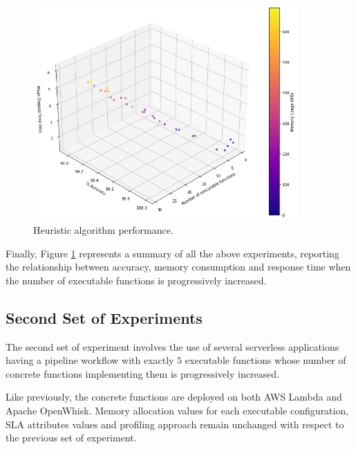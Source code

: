 \documentclass[12pt,a4paper]{report}
\begin{document}
\begin{figure}[h]
	\centering
	\includegraphics[width=0.9\textwidth]{./Images/ACO3DIncreasingExecutable.png}
	\caption{Heuristic algorithm performance.}%
	\label{ACO3DIncreasingExecutable}
\end{figure}

Finally, Figure \ref{ACO3DIncreasingExecutable} represents a summary of all the above experiments, reporting the relationship between accuracy, memory consumption and response time when the number of executable functions is progressively increased.

\newpage
\subsection{Second Set of Experiments}

The second set of experiment involves the use of several serverless applications having a pipeline workflow with exactly $5$ executable functions whose number of concrete functions implementing them is progressively increased. 

Like previously, the concrete functions are deployed on both AWS Lambda and Apache OpenWhisk. Memory allocation values for each executable configuration, SLA attributes values and profiling approach  remain unchanged with respect to the previous set of experiment. 
\end{document}
